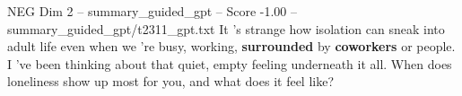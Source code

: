 \begin{textsample}{NEG Dim 2 – summary\_guided\_gpt – Score -1.00 – summary\_guided\_gpt/t2311\_gpt.txt}  \label{ex:f2_neg_032}
It ’s strange how isolation can sneak into adult life even when we ’re busy, working, \textbf{surrounded} by \textbf{coworkers} or people.
I ’ve been thinking about that quiet, empty feeling underneath it all.
When does loneliness show up most for you, and what does it feel like?

\end{textsample}
